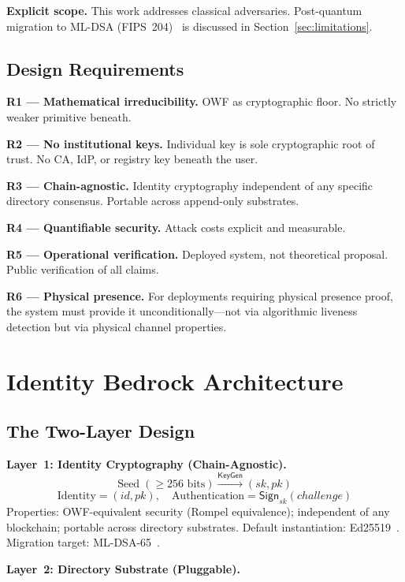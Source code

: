 \documentclass[12pt,a4paper]{article}
\begin{document}
\textbf{Explicit scope.} This work addresses classical adversaries.
Post-quantum migration to ML-DSA (FIPS~204)~\cite{FIPS204} is discussed
in Section~\ref{sec:limitations}.

\subsection{Design Requirements}

\textbf{R1 --- Mathematical irreducibility.} OWF as cryptographic floor.
No strictly weaker primitive beneath.

\textbf{R2 --- No institutional keys.} Individual key is sole
cryptographic root of trust. No CA, IdP, or registry key beneath the
user.

\textbf{R3 --- Chain-agnostic.} Identity cryptography independent of any
specific directory consensus. Portable across append-only substrates.

\textbf{R4 --- Quantifiable security.} Attack costs explicit and
measurable.

\textbf{R5 --- Operational verification.} Deployed system, not
theoretical proposal. Public verification of all claims.

\textbf{R6 --- Physical presence.} For deployments requiring physical
presence proof, the system must provide it unconditionally---not via
algorithmic liveness detection but via physical channel properties.

\section{Identity Bedrock Architecture}
\label{sec:architecture}

\subsection{The Two-Layer Design}

\textbf{Layer~1: Identity Cryptography (Chain-Agnostic).}
\[
  \text{Seed}\;(\geq 256\text{ bits})
  \xrightarrow{\mathsf{KeyGen}}
  (sk, pk)
\]
\[
  \text{Identity} = (\mathit{id}, pk),\quad
  \text{Authentication} = \mathsf{Sign}_{sk}(\mathit{challenge})
\]
Properties: OWF-equivalent security (Rompel equivalence); independent of
any blockchain; portable across directory substrates. Default
instantiation: Ed25519~\cite{EdDSA}. Migration target:
ML-DSA-65~\cite{FIPS204}.

\textbf{Layer~2: Directory Substrate (Pluggable).}
\end{document}

